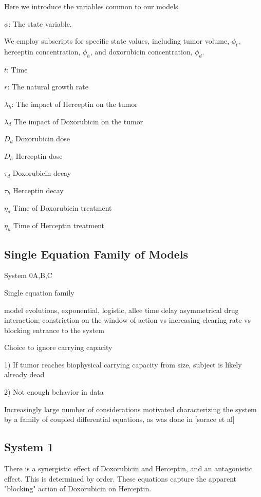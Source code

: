 \documentclass{article}
\begin{document}
Here we introduce the variables common to our models




$\phi$: The state variable.

We employ subscripts for specific state values, including tumor volume, $\phi_t$, herceptin concentration, $\phi_h$, and doxorubicin concentration, $\phi_d$.

$ t $: Time

$ r $: The natural growth rate

$ \lambda_h $: The impact of Herceptin on the tumor

$ \lambda_d $ The impact of Doxorubicin on the tumor

$ D_{d} $ Doxorubicin dose

$ D_{h} $ Herceptin dose

$ \tau_{d} $ Doxorubicin decay

$ \tau_{h} $ Herceptin decay

$ \eta_{d} $ Time of Doxorubicin treatment

$ \eta_{h} $ Time of Herceptin treatment





\subsection{Single Equation Family of Models}


System 0A,B,C

Single equation family

model evolutions, exponential, logistic, allee
time delay
asymmetrical drug interaction; constriction on the window of action vs increasing clearing rate vs blocking entrance to the system

Choice to ignore carrying capacity

1) If tumor reaches biophysical carrying capacity from size, subject is likely already dead

2) Not enough behavior in data
 
Increasingly large number of considerations motivated characterizing the system by a family of coupled differential equations, as was done in [sorace et al]


\subsection{System 1}

There is a synergistic effect of Doxorubicin and Herceptin, and an antagonistic effect. This is determined by order. These equations capture the apparent "blocking" action of Doxorubicin on Herceptin.
\end{document}
